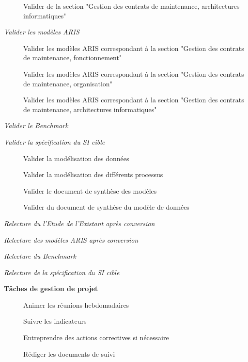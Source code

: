 \begin{description}
\begin{description}
\begin{description}
                    \item[\textbullet] Valider de la section "Gestion des contrats de maintenance, architectures informatiques"
                \end{description}
            \item[\textbullet] \it{Valider les modèles ARIS}
                \begin{description}
                    \item[\textbullet] Valider les modèles ARIS correspondant à la section "Gestion des contrats de maintenance, fonctionnement"
                    \item[\textbullet] Valider les modèles ARIS correspondant à la section "Gestion des contrats de maintenance, organisation"
                    \item[\textbullet] Valider les modèles ARIS correspondant à la section "Gestion des contrats de maintenance, architectures informatiques"
                \end{description}
            \item[\textbullet] \it{Valider le Benchmark}
            \item[\textbullet] \it{Valider la spécification du SI cible}
                \begin{description}
                    \item[\textbullet] Valider la modélisation des données
                    \item[\textbullet] Valider la modélisation des différents processus
                    \item[\textbullet] Valider le document de synthèse des modèles
                    \item[\textbullet] Valider du document de synthèse du modèle de données
                \end{description}
            \item[\textbullet] \it{Relecture du l’Etude de l’Existant après conversion}
            \item[\textbullet] \it{Relecture des modèles ARIS après conversion}
            \item[\textbullet] \it{Relecture du Benchmark}
            \item[\textbullet] \it{Relecture de la spécification du SI cible}
        \end{description}
    \item[] \bf{Tâches de gestion de projet}
        \begin{description}
            \item[\textbullet] Animer les réunions hebdomadaires
            \item[\textbullet] Suivre les indicateurs
            \item[\textbullet] Entreprendre des actions correctives si nécessaire 
            \item[\textbullet] Rédiger les documents de suivi
        \end{description}
\end{description}

